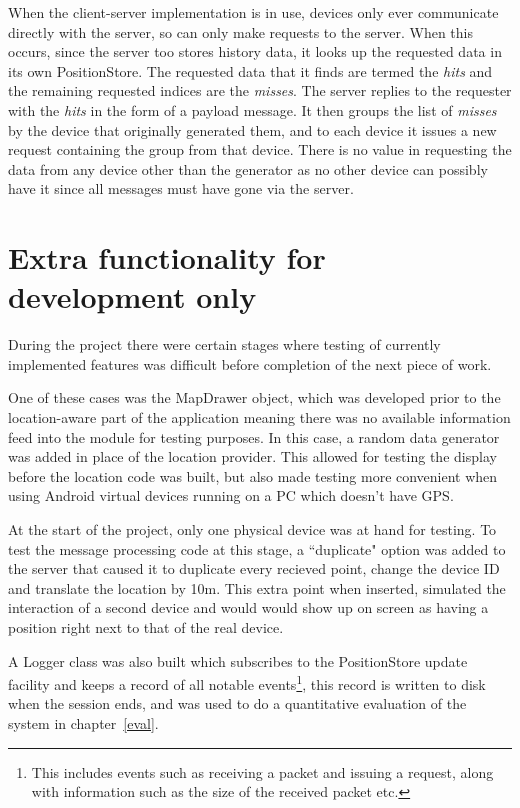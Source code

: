 When the client-server implementation is in use, devices only ever communicate directly with the server, so can only make requests to the server. When this occurs, since the server too stores history data, it looks up the requested data in its own PositionStore. The requested data that it finds are termed the \emph{hits} and the remaining requested indices are the \emph{misses}. The server replies to the requester with the \emph{hits} in the form of a payload message. It then groups the list of \emph{misses} by the device that originally generated them, and to each device it issues a new request containing the group from that device. There is no value in requesting the data from any device other than the generator as no other device can possibly have it since all messages must have gone via the server.

\section{Extra functionality for development only}

During the project there were certain stages where testing of currently implemented features was difficult before completion of the next piece of work.

One of these cases was the MapDrawer object, which was developed prior to the location-aware part of the application meaning there was no available information feed into the module for testing purposes. In this case, a random data generator was added in place of the location provider. This allowed for testing the display before the location code was built, but also made testing more convenient when using Android virtual devices running on a PC which doesn't have GPS.

At the start of the project, only one physical device was at hand for testing. To test the message processing code at this stage, a ``duplicate" option was added to the server that caused it to duplicate every recieved point, change the device ID and translate the location by 10m. This extra point when inserted, simulated the interaction of a second device and would would show up on screen as having a position right next to that of the real device.

\label{logging}
A Logger class was also built which subscribes to the PositionStore update facility and keeps a record of all notable events\footnote{This includes events such as receiving a packet and issuing a request, along with information such as the size of the received packet etc.}, this record is written to disk when the session ends, and was used to do a quantitative evaluation of the system in chapter~\ref{eval}.

